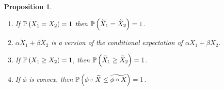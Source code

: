 \documentclass[12pt,a4paper]{amsart}
\theoremstyle{plain}%
\newtheorem{proposition}[thm]{Proposition}
\theoremstyle{definition}
\theoremstyle{remark}
\begin{document}
\begin{proposition}
  \begin{enumerate}\ 
  \item If $\operatorname{\mathbb P}\left(X_1 = X_2\right) = 1$ then $\operatorname{\mathbb P}\left(\widetilde X_1 =
      \widetilde X_2\right) = 1$.
  \item $\alpha \widetilde  X_1 + \beta \widetilde X_2$ is a version
    of the conditional expectation of $\alpha X_1 + \beta X_2$.
  \item If $\operatorname{\mathbb P}\left(X_1 \geq X_2\right) = 1$, then $\operatorname{\mathbb P}\left(\widetilde X_1 \geq
      \widetilde X_2\right) = 1$.
  \item If $\phi$ is convex, then $\operatorname{\mathbb P}\left(\phi\circ\widetilde X \leq
    \widetilde{\phi\circ X}\right) = 1$.
  \end{enumerate}
\end{proposition}
\end{document}
